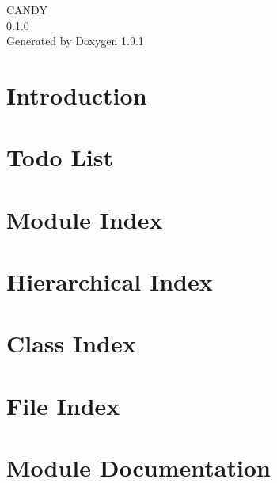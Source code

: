 \let\mypdfximage\pdfximage\def\pdfximage{\immediate\mypdfximage}\documentclass[twoside]{book}
\newcommand{\+}{\discretionary{\mbox{\scriptsize$\hookleftarrow$}}{}{}}
\newcommand{\clearemptydoublepage}{%
  \newpage{\pagestyle{empty}\cleardoublepage}%
}
\begin{document}
\raggedbottom

\hypersetup{pageanchor=false,
             bookmarksnumbered=true,
             pdfencoding=unicode
            }
\begin{titlepage}
\vspace*{7cm}
\begin{center}%
{\Large CANDY \\[1ex]\large 0.\+1.\+0 }\\
\vspace*{1cm}
{\large Generated by Doxygen 1.9.1}\\
\end{center}
\end{titlepage}
\clearemptydoublepage
{}
\tableofcontents
\clearemptydoublepage
{}
\hypersetup{pageanchor=true}

\chapter{Introduction}
\label{index}\hypertarget{index}{}
\chapter{Todo List}
\label{todo}

\chapter{Module Index}

\chapter{Hierarchical Index}

\chapter{Class Index}

\chapter{File Index}

\chapter{Module Documentation}















\end{document}
